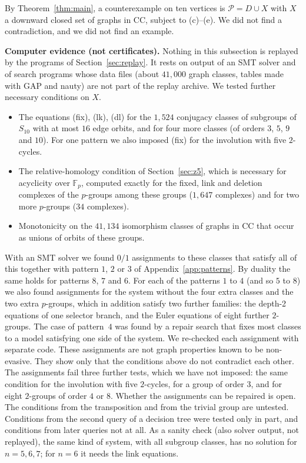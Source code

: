 \documentclass[11pt]{article}
\theoremstyle{plain}
\theoremstyle{definition}
\theoremstyle{remark}
\newcommand{\PP}{\mathcal P}
\newcommand{\F}{\mathbb F}
\begin{document}
By Theorem~\ref{thm:main}, a counterexample on ten vertices is $\PP=D\cup X$ with $X$ a downward closed set of graphs in $\mathrm{CC}$, subject to (c)--(e).
We did not find a contradiction, and we did not find an example.

\medskip\noindent
\textbf{Computer evidence (not certificates).}
Nothing in this subsection is replayed by the programs of Section~\ref{sec:replay}.
It rests on output of an SMT solver and of search programs whose data files (about $41{,}000$ graph classes, tables made with GAP and nauty) are not part of the replay archive.
We tested further necessary conditions on $X$.
\begin{itemize}[nosep]
\item The equations (fix), (lk), (dl) for the $1{,}524$ conjugacy classes of subgroups of $S_{10}$ with at most $16$ edge orbits, and for four more classes (of orders $3$, $5$, $9$ and $10$).
For one pattern we also imposed (fix) for the involution with five $2$-cycles.
\item The relative-homology condition of Section~\ref{sec:z5}, which is necessary for acyclicity over $\F_p$, computed exactly for the fixed, link and deletion complexes of the $p$-groups among these groups ($1{,}647$ complexes) and for two more $p$-groups ($34$ complexes).
\item Monotonicity on the $41{,}134$ isomorphism classes of graphs in $\mathrm{CC}$ that occur as unions of orbits of these groups.
\end{itemize}
With an SMT solver we found $0/1$ assignments to these classes that satisfy all of this together with pattern $1$, $2$ or $3$ of Appendix~\ref{app:patterns}.
By duality the same holds for patterns $8$, $7$ and $6$.
For each of the patterns $1$ to $4$ (and so $5$ to $8$) we also found assignments for the system without the four extra classes and the two extra $p$-groups, which in addition satisfy two further families: the depth-2 equations of one selector branch, and the Euler equations of eight further $2$-groups.
The case of pattern~$4$ was found by a repair search that fixes most classes to a model satisfying one side of the system.
We re-checked each assignment with separate code.
These assignments are not graph properties known to be non-evasive.
They show only that the conditions above do not contradict each other.
The assignments fail three further tests, which we have not imposed: the same condition for the involution with five $2$-cycles, for a group of order $3$, and for eight $2$-groups of order $4$ or $8$.
Whether the assignments can be repaired is open.
The conditions from the transposition and from the trivial group are untested.
Conditions from the second query of a decision tree were tested only in part, and conditions from later queries not at all.
As a sanity check (also solver output, not replayed), the same kind of system, with all subgroup classes, has no solution for $n=5,6,7$; for $n=6$ it needs the link equations.
\end{document}
